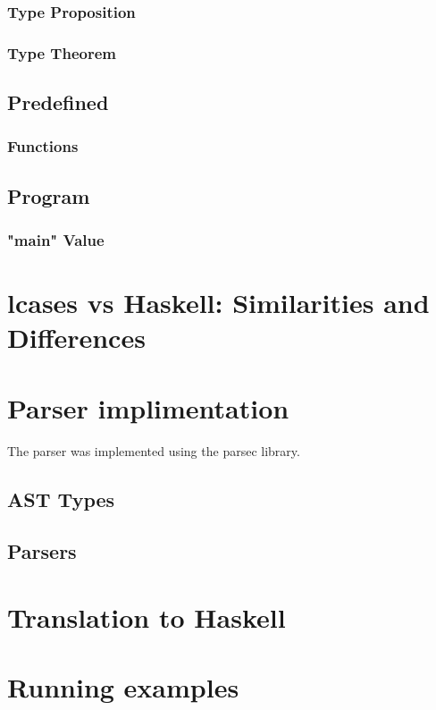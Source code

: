 \documentclass{article}
\def\H{Haskell}
\begin{document}
\subsubsection{Type Proposition}

\subsubsection{Type Theorem}

\subsection{Predefined}

\subsubsection{Functions}

\subsection{Program}

\subsubsection{"main" Value}

\section{lcases vs Haskell: Similarities and Differences}

\section{Parser implimentation}

The parser was implemented using the parsec library.

\subsection{AST Types}

\subsection{Parsers}

\section{Translation to \H}
\section{Running examples}
\end{document}
